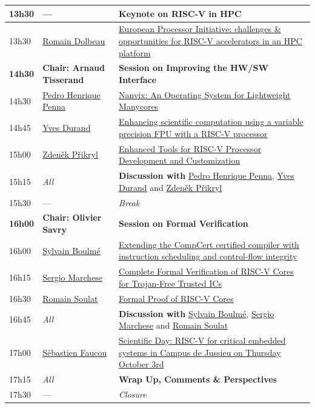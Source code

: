 \documentclass[a4paper, 10pt]{article}
\begin{document}
\begin{center}
\begin{tabular}{l|p{4cm}|p{11cm}}
\hline
\textbf{13h30} & --- & \textbf{Keynote on RISC-V in HPC}\\
\hline
13h30 & \hyperref[sec:orge116549]{Romain Dolbeau} & \hyperref[sec:orge116549]{European Processor Initiative: challenges \& opportunities for RISC-V accelerators in an HPC platform}\\
\hline
\textbf{14h30} & \textbf{Chair: Arnaud Tisserand} & \textbf{Session on Improving the HW/SW Interface}\\
\hline
14h30 & \hyperref[sec:org749a93b]{Pedro Henrique Penna} & \hyperref[sec:org749a93b]{Nanvix: An Operating System for Lightweight Manycores}\\
14h45 & \hyperref[sec:orgb60eba6]{Yves Durand} & \hyperref[sec:orgb60eba6]{Enhancing scientific computation using a variable precision FPU with a RISC-V processor}\\
15h00 & \hyperref[sec:org8b6a149]{Zdeněk Přikryl} & \hyperref[sec:org8b6a149]{Enhanced Tools for RISC-V Processor Development and Customization}\\
15h15 & \emph{All} & \textbf{Discussion with} \hyperref[sec:org749a93b]{Pedro Henrique Penna}, \hyperref[sec:orgb60eba6]{Yves Durand} and \hyperref[sec:org8b6a149]{Zdeněk Přikryl}\\
\hline
15h30 & --- & \emph{Break}\\
\hline
\textbf{16h00} & \textbf{Chair: Olivier Savry} & \textbf{Session on Formal Verification}\\
\hline
16h00 & \hyperref[sec:org5484e0d]{Sylvain Boulmé} & \hyperref[sec:org5484e0d]{Extending the CompCert certified compiler with instruction scheduling and control-flow integrity}\\
16h15 & \hyperref[sec:orga5c9455]{Sergio Marchese} & \hyperref[sec:orga5c9455]{Complete Formal Verification of RISC-V Cores for Trojan-Free Trusted ICs}\\
16h30 & \hyperref[sec:orgd8322bb]{Romain Soulat} & \hyperref[sec:orgd8322bb]{Formal Proof of RISC-V Cores}\\
16h45 & \emph{All} & \textbf{Discussion with} \hyperref[sec:org5484e0d]{Sylvain Boulmé}, \hyperref[sec:orga5c9455]{Sergio Marchese} and \hyperref[sec:orgd8322bb]{Romain Soulat}\\
\hline
17h00 & \href{../pages/gdr-scienday.html}{Sébastien Faucou} & \href{../pages/gdr-scienday.html}{Scientific Day: RISC-V for critical embedded systems in Campus de Jussieu on Thursday October 3rd}\\
17h15 & \emph{All} & \textbf{Wrap Up, Comments \& Perspectives}\\
17h30 & --- & \emph{Closure}\\
\hline
\end{tabular}
\end{center}
\end{document}

